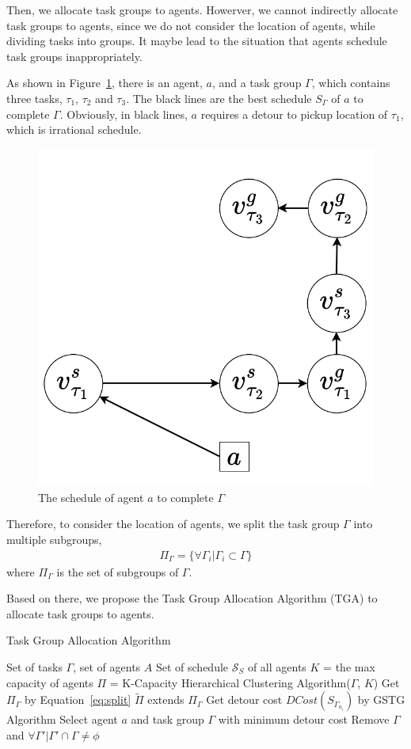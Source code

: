 \documentclass[sigconf,anonymous]{aamas}
\begin{document}
Then, we allocate task groups to agents.
Howerver, we cannot indirectly allocate task groups to agents,
since we do not consider the location of agents, while dividing tasks into groups.
It maybe lead to the situation that agents schedule task groups inappropriately.

\begin{example}
  As shown in Figure~\ref{fig:agent-taskgroup},
  there is an agent, $a$, and a task group $\Gamma$, which contains three tasks, $\tau_{1}$, $\tau_{2}$ and $\tau_{3}$.
  The black lines are the best schedule $S_\Gamma$ of $a$ to complete $\Gamma$.
  Obviously, in black lines, $a$ requires a detour to pickup location of $\tau_{1}$,
  which is irrational schedule.
  
  \begin{figure}[ht]
    \centering
    \includegraphics[width=0.3\linewidth]{Fig/A-TG.pdf}
    \caption{The schedule of agent $a$ to complete $\Gamma$}
    \label{fig:agent-taskgroup}
  \end{figure}
\end{example}

Therefore, to consider the location of agents,
we split the task group $\Gamma$ into multiple subgroups,
\begin{eqnarray}
  \label{eq:split}
  \Pi_{\Gamma} = \{ \forall \Gamma_i | \Gamma_i \subset \Gamma \}
\end{eqnarray}
where $\Pi_{\Gamma}$ is the set of subgroups of $\Gamma$.


Based on there,
we propose the Task Group Allocation Algorithm (TGA) to allocate task groups to agents.


\begin{algorithm}[htbp]
\caption{Task Group Allocation Algorithm}
\label{alg:TGA}
\begin{algorithmic}[1]
\Require Set of tasks $\Gamma$, set of agents $A$ %
\Ensure Set of schedule $\mathcal{S}_S$ of all agents %
\State $K$ = the max capacity of agents
\State $\Pi$ = K-Capacity Hierarchical Clustering Algorithm($\Gamma$, $K$)
\For {$\Gamma \in \Pi$}
    \State Get $\Pi_{\Gamma}$ by Equation~\ref{eq:split}
    \State ${\tilde{\Pi}}$ extends $\Pi_{\Gamma}$
\EndFor
{}
    \State Get detour cost $DCost(S_{\Gamma_{a_i}})$ by GSTG Algorithm
\EndFor
{}
    \State Select agent $a$ and task group $\Gamma$ with minimum detour cost
    \State Remove $\Gamma$ and $\forall \Gamma'| \Gamma'\cap \Gamma \neq \phi $
\EndWhile
\end{algorithmic}
\end{algorithm}
\end{document}
